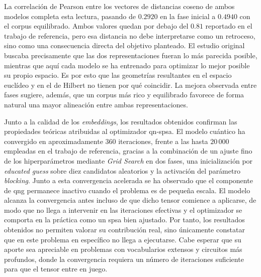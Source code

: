 La correlación de Pearson entre los vectores de distancias coseno de ambos modelos completa esta lectura, pasando de $0.2920$ en la fase inicial a $0.4940$ con el corpus equilibrado. Ambos valores quedan por debajo del $0.81$ reportado en el trabajo de referencia, pero esa distancia no debe interpretarse como un retroceso, sino como una consecuencia directa del objetivo planteado. El estudio original buscaba precisamente que las dos representaciones fueran lo más parecida posible, mientras que aquí cada modelo se ha entrenado para optimizar lo mejor posible su propio espacio. Es por esto que las geometrías resultantes en el espacio euclídeo y en el de Hilbert no tienen por qué coincidir. La mejora observada entre fases sugiere, además, que un corpus más rico y equilibrado favorece de forma natural una mayor alineación entre ambas representaciones.

Junto a la calidad de los \textit{embeddings}, los resultados obtenidos confirman las propiedades teóricas atribuidas al optimizador \gls{qn-spsa}. El modelo cuántico ha convergido en aproximadamente $360$ iteraciones, frente a las hasta $20\,000$ empleadas en el trabajo de referencia, gracias a la combinación de un ajuste fino de los hiperparámetros mediante \textit{Grid Search} en dos fases, una inicialización por \textit{educated guess} sobre diez candidatos aleatorios y la activación del parámetro \textit{blocking}. Junto a esta convergencia acelerada se ha observado que el componente de \gls{qng} permanece inactivo cuando el problema es de pequeña escala. El modelo alcanza la convergencia antes incluso de que dicho tensor comience a aplicarse, de modo que no llega a intervenir en las iteraciones efectivas y el optimizador se comporta en la práctica como un \gls{spsa} bien ajustado. Por tanto, los resultados obtenidos no permiten valorar su contribución real, sino únicamente constatar que en este problema en específico no llega a ejecutarse. Cabe esperar que su aporte sea apreciable en problemas con vocabularios extensos y circuitos más profundos, donde la convergencia requiera un número de iteraciones suficiente para que el tensor entre en juego.

